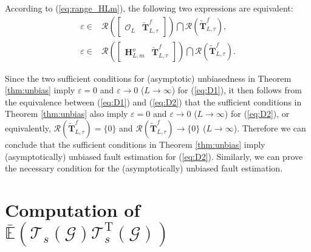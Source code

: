 \documentclass[twocolumn]{autart}
\begin{document}
According to (\ref{eq:range_HLm}), the following two expressions are equivalent:
\begin{align}
\varepsilon \in & \mathcal{R} \left( \left[ \begin{array}{cc}
\mathcal{O}_{L} & \mathbf{\breve T}_{L,\tau}^{f}
\end{array} \right] \right) \bigcap
\mathcal{R} \left( \mathbf{\tilde T}_{L,\tau}^{f} \right),  \label{eq:D1} \\
\varepsilon \in & \mathcal{R} \left( \left[ \begin{array}{cc}
\mathbf{H}_{L,m}^o & \mathbf{\breve T}_{L,\tau}^{f}
\end{array} \right] \right) \bigcap
\mathcal{R} \left( \mathbf{\tilde T}_{L,\tau}^{f} \right). \label{eq:D2}
\end{align}

\vspace{-0.5cm}

Since the two sufficient conditions for (asymptotic) unbiasedness in Theorem \ref{thm:unbias} imply $\varepsilon = 0$ and $\varepsilon \rightarrow 0$ ($L \rightarrow \infty$) for (\ref{eq:D1}), it then follows from the equivalence between (\ref{eq:D1}) and (\ref{eq:D2}) that 
the sufficient conditions in Theorem \ref{thm:unbias} also imply $\varepsilon = 0$ and $\varepsilon \rightarrow 0$ ($L \rightarrow \infty$) for (\ref{eq:D2}), or equivalently, $\mathcal{R} \left( \mathbf{\tilde T}_{L,\tau}^{f} \right) = \{0\}$ and $\mathcal{R} \left( \mathbf{\tilde T}_{L,\tau}^{f} \right) \rightarrow \{0\}$ ($L \rightarrow \infty$). Therefore we can conclude that the sufficient conditions in Theorem \ref{thm:unbias} imply  (asymptotically) unbiased fault estimation for (\ref{eq:D2}). Similarly, we can prove the necessary condition for the (asymptotically) unbiased fault estimation. 


\section{{Computation of $\mathbb{\bar E} \left( {\mathcal{T}}_{s} \left( \mathcal{G} \right) {\mathcal{T}}_{s}^\mathrm{T} \left( \mathcal{G} \right) \right) $} } \label{app:computations}
\end{document}
